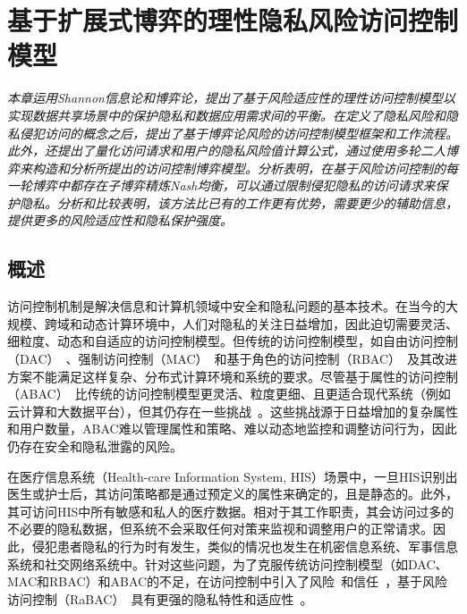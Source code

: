 \chapter{基于扩展式博弈的理性隐私风险访问控制模型}
\label{chap:game-theoretical-RaBAC-for-privacy}

\textit{}

\textit{本章运用Shannon信息论和博弈论，提出了基于风险适应性的理性访问控制模型以实现数据共享场景中的保护隐私和数据应用需求间的平衡。在定义了隐私风险和隐私侵犯访问的概念之后，提出了基于博弈论风险的访问控制模型框架和工作流程。此外，还提出了量化访问请求和用户的隐私风险值计算公式，通过使用多轮二人博弈来构造和分析所提出的访问控制博弈模型。分析表明，在基于风险访问控制的每一轮博弈中都存在子博弈精炼Nash均衡，可以通过限制侵犯隐私的访问请求来保护隐私。分析和比较表明，该方法比已有的工作更有优势，需要更少的辅助信息，提供更多的风险适应性和隐私保护强度。}

\section{概述}

访问控制机制是解决信息和计算机领域中安全和隐私问题的基本技术。在当今的大规模、跨域和动态计算环境中，人们对隐私的关注日益增加，因此迫切需要灵活、细粒度、动态和自适应的访问控制模型。但传统的访问控制模型，如自由访问控制（DAC）~\cite{lampson1974protection}、强制访问控制（MAC）~\cite{bell1973secure}和基于角色的访问控制（RBAC）~\cite{sandhu1996role}及其改进方案不能满足这样复杂、分布式计算环境和系统的要求。尽管基于属性的访问控制（ABAC）~\cite{kuhn2010adding}比传统的访问控制模型更灵活、粒度更细、且更适合现代系统（例如云计算和大数据平台），但其仍存在一些挑战~\cite{servos2017current,paci2018survey}。这些挑战源于日益增加的复杂属性和用户数量，ABAC难以管理属性和策略、难以动态地监控和调整访问行为，因此仍存在安全和隐私泄露的风险。

在医疗信息系统（Health-care Information System, HIS）场景中，一旦HIS识别出医生或护士后，其访问策略都是通过预定义的属性来确定的，且是静态的。此外，其可访问HIS中所有敏感和私人的医疗数据。相对于其工作职责，其会访问过多的不必要的隐私数据，但系统不会采取任何对策来监视和调整用户的正常请求。因此，侵犯患者隐私的行为时有发生，类似的情况也发生在机密信息系统、军事信息系统和社交网络系统中。针对这些问题，为了克服传统访问控制模型（如DAC、MAC和RBAC）和ABAC的不足，在访问控制中引入了风险~\cite{cheng2007fuzzy, zhang2018privacy}和信任~\cite{dimmock2004using, pustchi2015mt}，基于风险访问控制（RaBAC）~\cite{cheng2007fuzzy}具有更强的隐私特性和适应性~\cite{ni2010risk, wang2011quantified, zhang2018privacy}。


